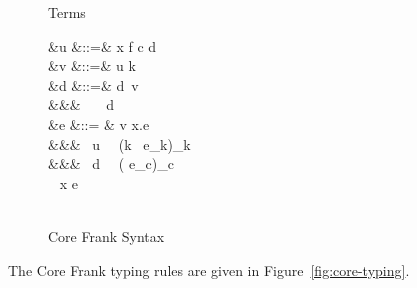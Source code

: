 \begin{figure}
Terms
\begin{syntax}
&u       &::=& x \mid f \mid c \mid d \\
&v       &::=& u \mid k~ \mid {}
\\[1ex]
&d &::=&  \mid d~v \\
                             &&\mid& ~~~d \\
 &e  &::= & v \mid \lambda x.e \\
   &&\mid& ~u~~
             (k~ \mapsto e_k)_k \\
   &&\mid& ~d~~
             \bstack
             ( \mapsto e_c)_c \\
             \medvert~ x        \mapsto e \\
             \estack \\
\end{syntax}
\caption{Core Frank Syntax}
\label{fig:core-syntax}
\end{figure}
%
The Core Frank typing rules are given in Figure~\ref{fig:core-typing}.
%
